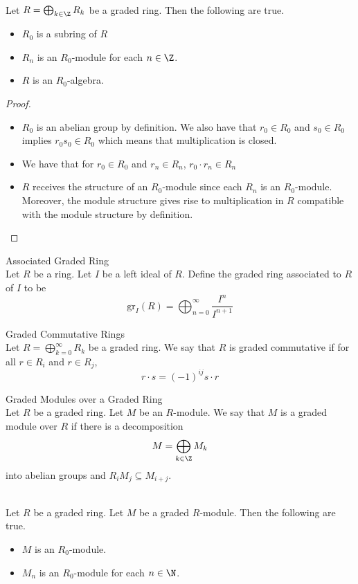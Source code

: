 \documentclass[a4paper]{article}
\begin{document}
\begin{prp}{}{}\\
Let $R=\bigoplus_{k\in\Z}R_k$ be a graded ring. Then the following are true. 
\begin{itemize}
\item $R_0$ is a subring of $R$
\item $R_n$ is an $R_0$-module for each $n\in\Z$. 
\item $R$ is an $R_0$-algebra. 
\end{itemize} 
\begin{proof}
\begin{itemize}
\item $R_0$ is an abelian group by definition. We also have that $r_0\in R_0$ and $s_0\in R_0$ implies $r_0s_0\in R_0$ which means that multiplication is closed. 
\item We have that for $r_0\in R_0$ and $r_n\in R_n$, $r_0\cdot r_n\in R_n$
\item $R$ receives the structure of an $R_0$-module since each $R_n$ is an $R_0$-module. Moreover, the module structure gives rise to multiplication in $R$ compatible with the module structure by definition. 
\end{itemize}
\end{proof}
\end{prp}

\begin{defn}{Associated Graded Ring}{}\\
Let $R$ be a ring. Let $I$ be a left ideal of $R$. Define the graded ring associated to $R$ of $I$ to be $$\text{gr}_I(R)=\bigoplus_{n=0}^\infty\frac{I^n}{I^{n+1}}$$
\end{defn}

\begin{defn}{Graded Commutative Rings}{}\\
Let $R=\bigoplus_{k=0}^\infty R_k$ be a graded ring. We say that $R$ is graded commutative if for all $r\in R_i$ and $r\in R_j$, $$r\cdot s=(-1)^{ij}s\cdot r$$
\end{defn}

\begin{defn}{Graded Modules over a Graded Ring}{}\\
Let $R$ be a graded ring. Let $M$ be an $R$-module. We say that $M$ is a graded module over $R$ if there is a decomposition $$M=\bigoplus_{k\in\Z}M_k$$ into abelian groups and $R_iM_j\subseteq M_{i+j}$. 
\end{defn}

\begin{prp}{}{}\\
Let $R$ be a graded ring. Let $M$ be a graded $R$-module. Then the following are true. 
\begin{itemize}
\item $M$ is an $R_0$-module. 
\item $M_n$ is an $R_0$-module for each $n\in\N$. 
\end{itemize}
\end{prp}
\end{document}
